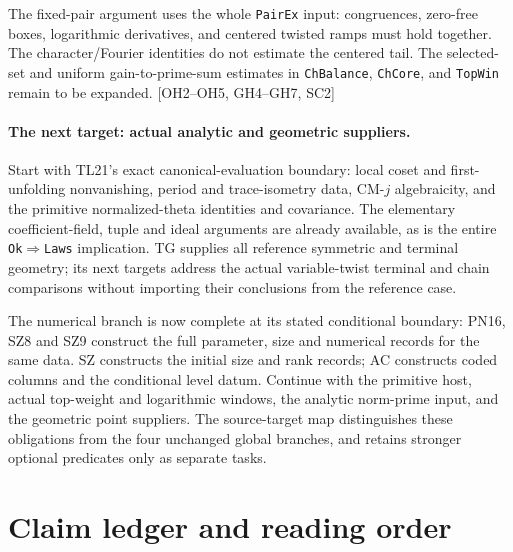 \documentclass[11pt,a4paper]{article}
\numberwithin{equation}{section}
\theoremstyle{remark}\newtheorem{remark}[theorem]{Remark}
\begin{document}
\begin{description}[style=nextline]
\item[Simultaneous prime selection and the centered target.]
The fixed-pair argument uses the whole \texttt{PairEx} input: congruences, zero-free boxes, logarithmic derivatives, and centered twisted ramps must hold together. The character/Fourier identities do not estimate the centered tail. The selected-set and uniform gain-to-prime-sum estimates in \texttt{ChBalance}, \texttt{ChCore}, and \texttt{TopWin} remain to be expanded. \textsf{[OH2--OH5, GH4--GH7, SC2]}
\end{description}

\paragraph{The next target: actual analytic and geometric suppliers.}
Start with TL21's exact canonical-evaluation boundary: local coset and
first-unfolding nonvanishing, period and trace-isometry data, CM-$j$
algebraicity, and the primitive normalized-theta identities and covariance.
The elementary coefficient-field, tuple and ideal arguments are already
available, as is the entire \texttt{Ok}$\Rightarrow$\texttt{Laws}
implication. TG supplies all reference symmetric and terminal geometry;
its next targets address the actual variable-twist terminal and chain
comparisons without importing their conclusions from the reference case.

The numerical branch is now complete at its stated conditional boundary:
PN16, SZ8 and SZ9 construct the full parameter, size and numerical records
for the same data. SZ constructs the initial size and rank records; AC
constructs coded columns and the conditional level datum. Continue with
the primitive host, actual top-weight and logarithmic windows, the
analytic norm-prime input, and the geometric point suppliers. The
source-target map distinguishes these obligations from the four
unchanged global branches, and retains stronger optional predicates
only as separate tasks.


\section{Claim ledger and reading order}
\end{document}
